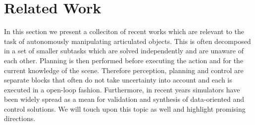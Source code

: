 \section{Related Work}
\label{sec:Related Work}


In this section we present a colleciton of recent works which are relevant to the task of autonomously manipulating articulated objects. This is often decomposed in a set of smaller subtasks which are solved independently and are unaware of each other. Planning is then performed before executing the action and for the current knowledge of the scene. Therefore perception, planning and control are separate blocks that often do not take uncertainty into account and each is executed in a open-loop fashion. Furthermore, in recent years simulators have been widely spread as a mean for validation and synthesis of data-oriented and control solutions. We will touch upon this topic as well and highlight promising directions.

